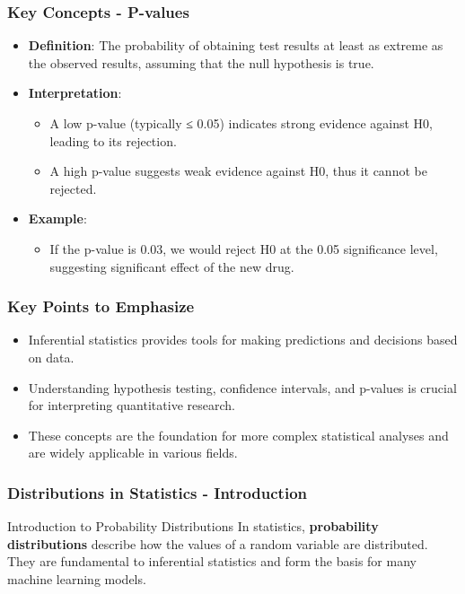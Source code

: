 \documentclass{beamer}
\begin{document}
\begin{frame}[fragile]
    \frametitle{Key Concepts - P-values}
    \begin{itemize}
        \item \textbf{Definition}: The probability of obtaining test results at least as extreme as the observed results, assuming that the null hypothesis is true.
        \item \textbf{Interpretation}:
        \begin{itemize}
            \item A low p-value (typically ≤ 0.05) indicates strong evidence against H0, leading to its rejection.
            \item A high p-value suggests weak evidence against H0, thus it cannot be rejected.
        \end{itemize}
        \item \textbf{Example}:
        \begin{itemize}
            \item If the p-value is 0.03, we would reject H0 at the 0.05 significance level, suggesting significant effect of the new drug.
        \end{itemize}
    \end{itemize}
\end{frame}

\begin{frame}[fragile]
    \frametitle{Key Points to Emphasize}
    \begin{itemize}
        \item Inferential statistics provides tools for making predictions and decisions based on data.
        \item Understanding hypothesis testing, confidence intervals, and p-values is crucial for interpreting quantitative research.
        \item These concepts are the foundation for more complex statistical analyses and are widely applicable in various fields.
    \end{itemize}
\end{frame}

\begin{frame}[fragile]
    \frametitle{Distributions in Statistics - Introduction}
    \begin{block}{Introduction to Probability Distributions}
        In statistics, \textbf{probability distributions} describe how the values of a random variable are distributed. They are fundamental to inferential statistics and form the basis for many machine learning models.
    \end{block}
\end{frame}
\end{document}
